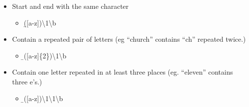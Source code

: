\documentclass[
]{article}
\providecommand{\tightlist}{%
  \setlength{\itemsep}{0pt}\setlength{\parskip}{0pt}}
\begin{document}
\begin{itemize}
\tightlist
\item
  Start and end with the same character

  \begin{itemize}
  \tightlist
  \item
    \b({[}a-z{]})\w*\textbackslash1\textbackslash b
  \end{itemize}
\item
  Contain a repeated pair of letters (eg ``church'' contains ``ch''
  repeated twice.)

  \begin{itemize}
  \tightlist
  \item
    \b\w*({[}a-z{]}\{2\})\w*\textbackslash1\w*\textbackslash b
  \end{itemize}
\item
  Contain one letter repeated in at least three places (eg. ``eleven''
  contains three e's.)

  \begin{itemize}
  \tightlist
  \item
    \b\w*({[}a-z{]})\w*\textbackslash1\w*\textbackslash1\w*\textbackslash b
  \end{itemize}
\end{itemize}
\end{document}
